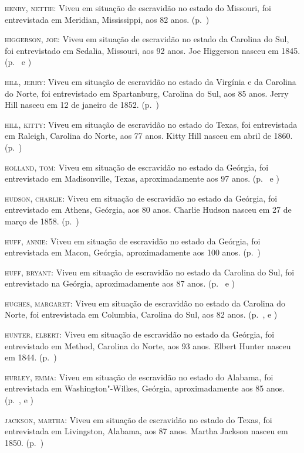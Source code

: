 \begin{Parskip}
\textsc{henry, nettie:} Viveu em situação de escravidão no estado do Missouri, foi entrevistada
em Meridian, Mississippi, aos 82 anos. (p.~\pageref{ref142})

\textsc{higgerson, joe:} Viveu em situação de escravidão no estado da Carolina do Sul, foi
entrevistado em Sedalia, Missouri, aos 92 anos. Joe Higgerson nasceu em
1845. (p.~\pageref{ref143} e \pageref{ref144})

\textsc{hill, jerry:} Viveu em situação de escravidão no estado da Virgínia e da Carolina do
Norte, foi entrevistado em Spartanburg, Carolina do Sul, aos 85 anos.
Jerry Hill nasceu em 12 de janeiro de 1852. (p.~\pageref{ref145})

\textsc{hill, kitty:} Viveu em situação de escravidão no estado do Texas, foi entrevistada em
Raleigh, Carolina do Norte, aos 77 anos. Kitty Hill nasceu em abril de
1860. (p.~\pageref{ref146})

\textsc{holland, tom:} Viveu em situação de escravidão no estado da Geórgia, foi entrevistado em
Madisonville, Texas, aproximadamente aos 97 anos. (p.~\pageref{ref147} e \pageref{ref148})

\textsc{hudson, charlie:} Viveu em situação de escravidão no estado da Geórgia, foi entrevistado
em Athens, Geórgia, aos 80 anos. Charlie Hudson nasceu em 27 de março de
1858. (p.~\pageref{ref149})

\textsc{huff, annie:} Viveu em situação de escravidão no estado da Geórgia, foi entrevistada em
Macon, Geórgia, aproximadamente aos 100 anos. (p.~\pageref{ref150})

\textsc{huff, bryant:} Viveu em situação de escravidão no estado da Carolina do Sul, foi
entrevistado na Geórgia, aproximadamente aos 87 anos. (p.~\pageref{ref151} e \pageref{ref152})

\textsc{hughes, margaret:} Viveu em situação de escravidão no estado da Carolina do Norte, foi
entrevistada em Columbia, Carolina do Sul, aos 82 anos. (p.~\pageref{ref153}, \pageref{ref154} e \pageref{ref155})

\textsc{hunter, elbert:} Viveu em situação de escravidão no estado da Geórgia, foi entrevistado
em Method, Carolina do Norte, aos 93 anos. Elbert Hunter nasceu em 1844. (p.~\pageref{ref156})

\textsc{hurley, emma:} Viveu em situação de escravidão no estado do Alabama, foi entrevistada em
Washington"-Wilkes, Geórgia, aproximadamente aos 85 anos. (p.~\pageref{ref157}, \pageref{ref158} e \pageref{ref159})

\textsc{jackson, martha:} Viveu em situação de escravidão no estado do Texas, foi entrevistada
em Livingston, Alabama, aos 87 anos. Martha Jackson nasceu em 1850. (p.~\pageref{ref160})


\end{Parskip}
